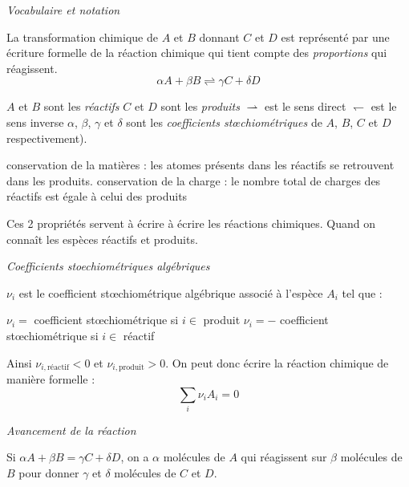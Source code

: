 \documentclass[a4paper,french,bookmarks]{book}
\begin{document}
    \begin{center}
        \emph{Vocabulaire et notation}
    \end{center}
    La transformation chimique de $A$ et $B$ donnant $C$ et $D$ est représenté par une écriture formelle de la réaction chimique qui tient compte des \emph{proportions} qui réagissent.
    \[ \alpha A + \beta B \rightleftharpoons \gamma C + \delta D \]
    \begin{enumerate}
        \itt $A$ et $B$ sont les \emph{réactifs}
        \itt $C$ et $D$ sont les \emph{produits}
        \itt $\rightharpoonup$ est le sens direct
        \itt $\leftharpoondown$ est le sens inverse
        \itt $\alpha$, $\beta$, $\gamma$ et $\delta$ sont les \emph{coefficients st\oe{}chiométriques} de $A$, $B$, $C$ et $D$ respectivement).
    \end{enumerate}
    
    
    \begin{property}{}{}
        \begin{enumerate}
            \itt conservation de la matières : les atomes présents dans les réactifs se retrouvent dans les produits.
            \itt conservation de la charge : le nombre total de charges des réactifs est égale à celui des produits
        \end{enumerate}
    \end{property}
    
    Ces 2 propriétés servent à écrire à écrire les réactions chimiques. Quand on connaît les espèces réactifs et produits.
    
    \begin{center}
        \emph{Coefficients stoechiométriques algébriques}
    \end{center}
    
    $\nu_i$ est le coefficient st\oe{}chiométrique algébrique associé à l'espèce $A_i$ tel que :
    \begin{enumerate}
        \itt $\nu_i = $ coefficient st\oe{}chiométrique si $i \in $ produit
        \itt $\nu_i = -$ coefficient st\oe{}chiométrique si $i \in$ réactif
    \end{enumerate}
    Ainsi $\nu_{i,\text{réactif}} < 0$ et $\nu_{i,\text{produit}} > 0$. On peut donc écrire la réaction chimique de manière formelle :
    \[ \sum_i \nu_iA_i = 0\]
    
    
    \begin{center}
        \emph{Avancement de la réaction}
    \end{center}
    Si $\alpha A + \beta B = \gamma C + \delta D$, on a $\alpha$ molécules de $A$ qui réagissent sur $\beta$ molécules de $B$ pour donner $\gamma$ et $\delta$ molécules de $C$ et $D$.
    
\end{document}
